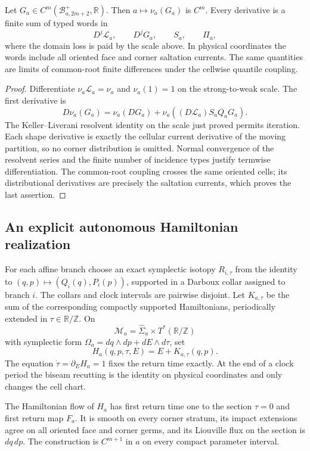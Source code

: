\begin{theorem}
\label{thm:r7-a1-response}
Let $G_a\in C^m(\mathscr B_{a,2m+2}^+,\mathbb R)$.  Then
$a\mapsto\nu_a(G_a)$ is $C^m$.  Every derivative is a finite sum of typed
words in
\[
 D^j\mathcal L_a,
 \qquad D^jG_a,
 \qquad S_a,
 \qquad\Pi_a,
\]
where the domain loss is paid by the scale above.  In physical coordinates
the words include all oriented face and corner saltation currents.  The same
quantities are limits of common-root finite differences under the cellwise
quantile coupling.
\end{theorem}

\begin{proof}
Differentiate $\nu_a\mathcal L_a=\nu_a$ and
$\nu_a(1)=1$ on the strong-to-weak scale.  The first derivative is
\[
 D\nu_a(G_a)=\nu_a(DG_a)+
 \nu_a((D\mathcal L_a)S_aQ_aG_a).
\]
The Keller--Liverani resolvent identity on the scale just proved permits
iteration.  Each shape derivative is exactly the cellular current derivative
of the moving partition, so no corner distribution is omitted.  Normal
convergence of the resolvent series and the finite number of incidence types
justify termwise differentiation.  The common-root coupling crosses the same
oriented cells; its distributional derivatives are precisely the saltation
currents, which proves the last assertion.
\end{proof}

\subsection{An explicit autonomous Hamiltonian realization}

For each affine branch choose an exact symplectic isotopy
$R_{i,\tau}$ from the identity to
$(q,p)\mapsto(Q_i(q),P_i(p))$, supported in a Darboux collar assigned to
branch $i$.  The collars and clock intervals are pairwise disjoint.  Let
$K_{a,\tau}$ be the sum of the corresponding compactly supported Hamiltonians,
periodically extended in $\tau\in\mathbb R/\mathbb Z$.  On
\[
 \mathcal M_a=\widehat\Sigma_a\times T^*(\mathbb R/\mathbb Z)
\]
with symplectic form
$\Omega_a=dq\wedge dp+dE\wedge d\tau$, set
\[
 H_a(q,p,\tau,E)=E+K_{a,\tau}(q,p).
\]
The equation $\dot\tau=\partial_EH_a=1$ fixes the return time exactly.
At the end of a clock period the biseam recutting is the identity on physical
coordinates and only changes the cell chart.

\begin{theorem}
\label{thm:r7-a1-suspension}
The Hamiltonian flow of $H_a$ has first return time one to the section
$\tau=0$ and first return map $F_a$.  It is smooth on every corner stratum,
its impact extensions agree on all oriented face and corner germs, and its
Liouville flux on the section is $dq\,dp$.  The construction is $C^{m+1}$ in
$a$ on every compact parameter interval.
\end{theorem}

